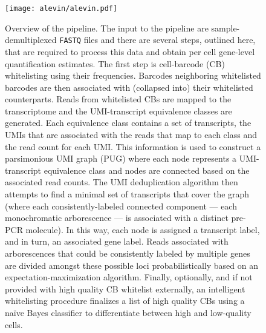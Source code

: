 \begin{figure}
    \centering
    \texttt{[image: alevin/alevin.pdf]}
\caption{Overview of the \alevin pipeline. The input to the pipeline are sample-demultiplexed \texttt{FASTQ} files and there are several steps, outlined here, that are required to process this data and obtain per cell gene-level quantification estimates. The first step is cell-barcode (CB) whitelisting using their frequencies. Barcodes neighboring whitelisted barcodes are then associated with (collapsed into) their whitelisted counterparts. Reads from whitelisted CBs are mapped to the transcriptome and the UMI-transcript equivalence classes are generated. Each equivalence class contains a set of transcripts, the UMIs that are associated with the reads that map to each class and the read count for each UMI. This information is used to construct a parsimonious UMI graph (PUG) where each node represents a UMI-transcript equivalence class and nodes are connected based on the associated read counts. The UMI deduplication algorithm then attempts to find a minimal set of transcripts that cover the graph (where each consistently-labeled connected component --- each monochromatic arborescence --- is associated with a distinct pre-PCR molecule). In this way, each node is assigned a transcript label, and in turn, an associated gene label. Reads associated with arborescences that could be consistently labeled by multiple genes are divided amongst these possible loci probabilistically based on an expectation-maximization algorithm. Finally, optionally, and if not provided with high quality CB whitelist externally, an intelligent whitelisting procedure finalizes a list of high quality CBs using a na\"ive Bayes classifier to differentiate between high and low-quality cells.}
\label{fig:pipeline}
\end{figure}

